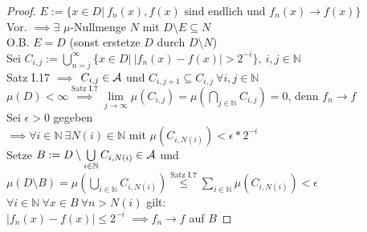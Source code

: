   \begin{proof}
    $E := \{x \in D |\ f_n(x), f(x) \text{ sind endlich und } f_n(x) \to f(x)\}$\\
    Vor. $\implies \exists$ $\mu$-Nullmenge $N$ mit $D\setminus E \subseteq N$\\
    O.B. $E = D$ (sonst erstetze $D$ durch $D \setminus N$)\\
    Sei $C_{i,j} := \bigcup\limits_{n=j}^{\infty} \{x \in D |\ |f_n(x) - f(x)| > 2^{-i}\}, \ i,j \in \mathbb{N}$\\
    Satz I.17 $\implies$ $C_{i,j} \in \mathcal{A}$ und $C_{i,j+1} \subseteq C_{i,j} \ \forall i,j \in \mathbb{N}$\\
    $\mu(D) < \infty \stackrel{\text{Satz I.7}}{\implies} \lim\limits_{j \to \infty} \mu(C_{i,j}) = \mu(\bigcap\limits_{j \in \mathbb N} C_{i,j}) = 0$, denn $f_n \to f$\\
    Sei $\epsilon > 0$ gegeben\\
    $\implies \forall i \in \mathbb{N} \ \exists N(i) \in \mathbb{N}$ mit $\mu(C_{i,N(i)}) < \epsilon * 2^{-i}$\\
    Setze $B := D \setminus \bigcup\limits_{i \in \mathbb{N}} C_{i,N(i)} \in \mathcal{A}$ und $\mu(D \setminus B) = \mu(\bigcup\limits_{i \in \mathbb{N}} C_{i,N(i)}) \stackrel{\text{Satz I.7}}{\leq} \sum\limits_{i \in \mathbb{N}} \mu(C_{i,N(i)}) < \epsilon$\\
    $\forall i\in \mathbb{N} \ \forall x \in B \ \forall n>N(i)$ gilt:\\
    $|f_n(x) - f(x)| \leq 2^{-i}$
    $\implies f_n \to f$ auf $B$
  \end{proof}

